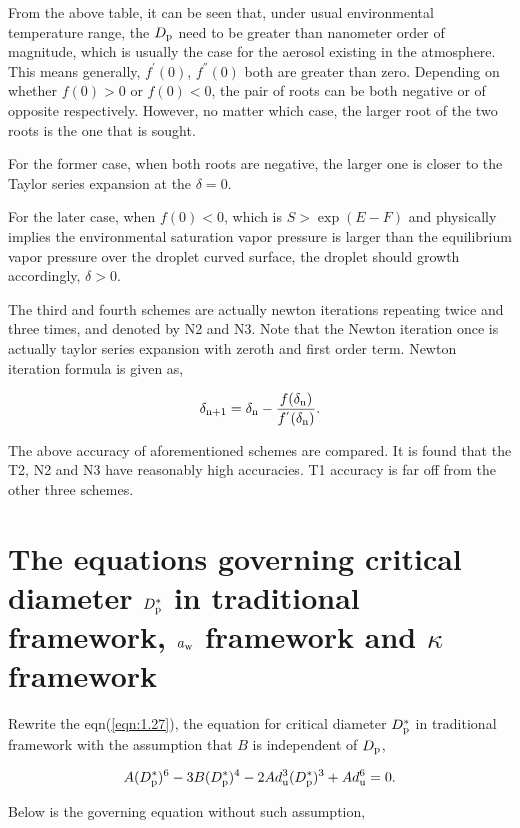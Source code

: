 \documentclass[12pt]{article}
\begin{document}
{From the above table, it can be seen that, under usual environmental temperature range, the $D_{\rm p}$ need to be greater than nanometer order of magnitude, which is usually the case for the aerosol existing in the atmosphere.
This means generally, $f^{'}(0)$, $f^{''}(0)$ both are greater than zero. Depending on whether $f(0)>0$ or $f(0)<0$, the pair of roots can be both negative or of opposite respectively. However, no matter which case, the larger root of the two roots is the one that is sought. 

For the former case, when both roots are negative, the larger one is closer to the Taylor series expansion at the $\delta=0$. 


For the later case, when $f(0)<0$, which is $S>\exp(E-F)$ and physically implies the environmental saturation vapor pressure is larger than the equilibrium vapor pressure over the droplet curved surface, the droplet should growth accordingly, $\delta>0$.


The third and fourth schemes are actually newton iterations repeating twice and three times, and denoted by N2 and N3. Note that the Newton iteration once is actually taylor series expansion with zeroth and first order term. Newton iteration formula is given as,

\begin{equation}
\delta_{\rm n+1}=\delta_{\rm n}-\frac{f(\delta_{\rm n})}{f^{'}(\delta_{\rm n})}.
\end{equation}

The above accuracy of aforementioned schemes are compared. It is found that the T2, N2 and N3 have reasonably high accuracies. T1 accuracy is far off from the other three schemes.


\section{The equations governing critical diameter $D_{\rm p}^{*}$ in traditional framework, $a_{\rm w}$ framework and $\kappa$ framework}

Rewrite the eqn(\ref{eqn:1.27}), the equation for critical diameter $D_{\rm p}^{*}$ in traditional framework with the assumption that $B$ is independent of $D_{\rm p}$,

\begin{equation}\label{eqn:12.1}
A(D_{\rm p}^{*})^{6}-3B(D_{\rm p}^{*})^{4}-2 Ad_{\rm u}^{3}(D_{\rm p}^{*})^{3}+ A d_{\rm u}^{6}=0.
\end{equation}

Below is the governing equation without such assumption, 

}
\end{document}
